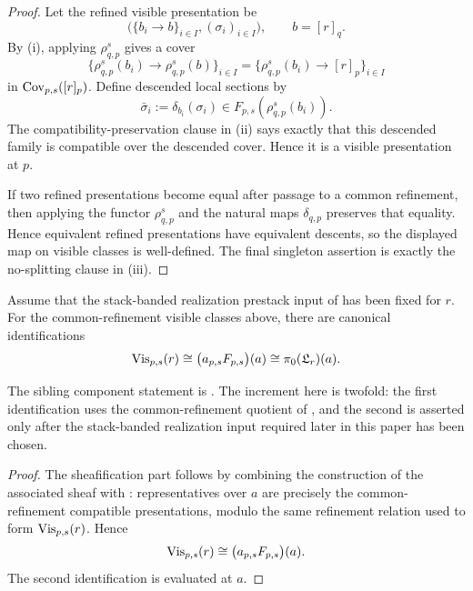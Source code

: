 \begin{proof}
Let the refined visible presentation be
\[
\bigl(\{b_i\to b\}_{i\in I},(\sigma_i)_{i\in I}\bigr),
\qquad b=[r]_q.
\]
By (i), applying
$\rho_{q,p}^s$ gives a cover
\[
\{\rho_{q,p}^s(b_i)\to \rho_{q,p}^s(b)\}_{i\in I}
=
\{\rho_{q,p}^s(b_i)\to [r]_p\}_{i\in I}
\]
in $\mathrm{Cov}_{p,s}([r]_p)$. Define descended local sections by
\[
\bar\sigma_i:=\delta_{b_i}(\sigma_i)\in F_{p,s}(\rho_{q,p}^s(b_i)).
\]
The compatibility-preservation clause in
(ii) says exactly that this
descended family is compatible over the descended cover. Hence it is a visible
presentation at $p$.

If two refined presentations become equal after passage to a common refinement,
then applying the functor $\rho_{q,p}^s$ and the natural maps $\delta_{q,p}$
preserves that equality. Hence equivalent refined presentations have equivalent
descents, so the displayed map on visible classes is well-defined. The final
singleton assertion is exactly the no-splitting clause in
(iii).
\end{proof}

\begin{theorem}\label{thm:visible-value-components}
Assume that the stack-banded realization prestack input of
 has been fixed for $r$. For the
common-refinement visible classes above, there are canonical identifications
\[
\mathrm{Vis}_{p,s}(r)\cong \bigl(a_{p,s}F_{p,s}\bigr)(a)\cong \pi_0(\mathfrak L_r)(a).
\]
\end{theorem}

\begin{remark}
The sibling component statement is
\cite[Proposition~4.41]{HomologicalVisibilityGluingObstructions2026}. The
increment here is twofold: the first identification uses the common-refinement
quotient of , and the second is asserted only
after the stack-banded realization input required later in this paper has been
chosen.
\end{remark}

\begin{proof}
The sheafification part follows by combining the construction of the associated
sheaf with : representatives over
$a$ are precisely the common-refinement compatible presentations, modulo the
same refinement relation used to form $\mathrm{Vis}_{p,s}(r)$. Hence
\[
\mathrm{Vis}_{p,s}(r)\cong \bigl(a_{p,s}F_{p,s}\bigr)(a).
\]
The second identification is  evaluated at $a$.
\end{proof}

